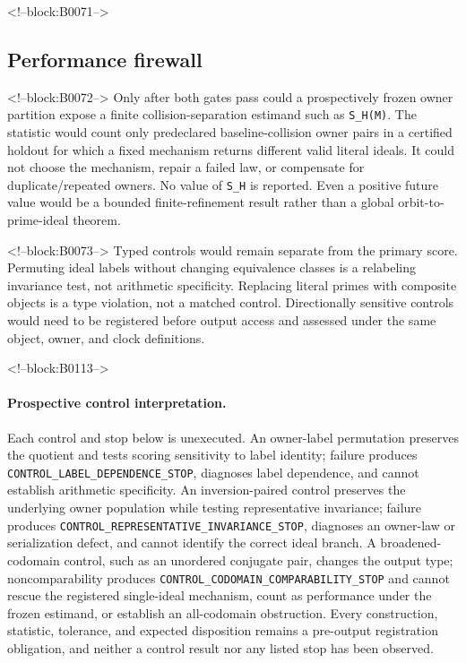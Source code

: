 \documentclass[11pt,a4paper]{article}
\begin{document}
<!--block:B0071-->
\subsection{Performance firewall}

<!--block:B0072-->
Only after both gates pass could a prospectively frozen owner partition expose a finite collision-separation estimand such as \texttt{S\_H(M)}. The statistic would count only predeclared baseline-collision owner pairs in a certified holdout for which a fixed mechanism returns different valid literal ideals. It could not choose the mechanism, repair a failed law, or compensate for duplicate/repeated owners. No value of \texttt{S\_H} is reported. Even a positive future value would be a bounded finite-refinement result rather than a global orbit-to-prime-ideal theorem.

<!--block:B0073-->
Typed controls would remain separate from the primary score. Permuting ideal labels without changing equivalence classes is a relabeling invariance test, not arithmetic specificity. Replacing literal primes with composite objects is a type violation, not a matched control. Directionally sensitive controls would need to be registered before output access and assessed under the same object, owner, and clock definitions.

<!--block:B0113-->
\paragraph{Prospective control interpretation.} Each control and stop below is unexecuted. An owner-label permutation preserves the quotient and tests scoring sensitivity to label identity; failure produces \texttt{CONTROL\_LABEL\_DEPENDENCE\_STOP}, diagnoses label dependence, and cannot establish arithmetic specificity. An inversion-paired control preserves the underlying owner population while testing representative invariance; failure produces \texttt{CONTROL\_REPRESENTATIVE\_INVARIANCE\_STOP}, diagnoses an owner-law or serialization defect, and cannot identify the correct ideal branch. A broadened-codomain control, such as an unordered conjugate pair, changes the output type; noncomparability produces \texttt{CONTROL\_CODOMAIN\_COMPARABILITY\_STOP} and cannot rescue the registered single-ideal mechanism, count as performance under the frozen estimand, or establish an all-codomain obstruction. Every construction, statistic, tolerance, and expected disposition remains a pre-output registration obligation, and neither a control result nor any listed stop has been observed.
\end{document}
